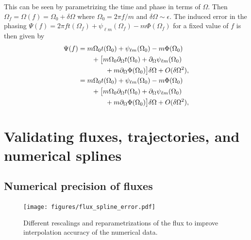 \documentclass[%
 reprint,
 nofootinbib,
 amsmath,amssymb,
 aps,
 prd,
]{revtex4-2}
\begin{document}
This can be seen by parametrizing the time and phase in terms of $\Omega$. Then $\Omega_f = \Omega(f) = \Omega_0 + \delta\Omega$ where $\Omega_0 = 2\pi f/m$ and $\delta\Omega \sim \epsilon$. The induced error in the phasing $\Psi(f) = 2\pi f t(\Omega_f) + \psi_{\ell m}(\Omega_f) - m\Phi(\Omega_f)$ for a fixed value of $f$ is then given by
\begin{align}
    \Psi(f) &=
    m\Omega_0 t(\Omega_0) + \psi_{\ell m}(\Omega_0) - m\Phi(\Omega_0) 
    \\ \notag
    & \qquad + \big[m\Omega_0 \partial_\Omega t(\Omega_0) + \partial_\Omega\psi_{\ell m}(\Omega_0) 
    \\ \notag
    & \qquad \qquad + m\partial_\Omega\Phi(\Omega_0)\big]\delta \Omega + O(\delta\Omega^2),
    \\
    &=
    m\Omega_0 t(\Omega_0) + \psi_{\ell m}(\Omega_0) - m\Phi(\Omega_0) 
    \\ \notag
    & \qquad + \big[m\Omega_0 \partial_\Omega t(\Omega_0) + \partial_\Omega\psi_{\ell m}(\Omega_0) 
    \\ \notag
    & \qquad \qquad + m\partial_\Omega\Phi(\Omega_0)\big]\delta \Omega + O(\delta\Omega^2),
\end{align}

\section{Validating fluxes, trajectories, and numerical splines}
\label{app:tests}

\subsection{Numerical precision of fluxes}
\label{app:fluxtests}

\begin{figure}[h!]
    \centering
    \texttt{[image: figures/flux\_spline\_error.pdf]}
    \caption{Different rescalings and reparametrizations of the flux to improve interpolation accuracy of the numerical data.}
    \label{fig:fluxSplineError}
\end{figure}
\end{document}
